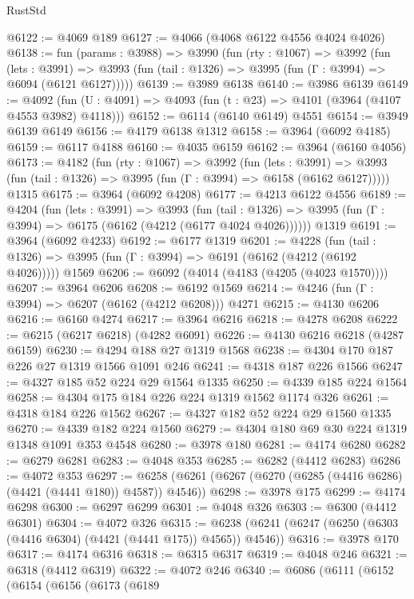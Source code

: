 \begin{lexlean}{RustStd}
\begin{coremodule}
{\begin{coremodule}
{{{{{{{{{{{{{{{{{{{{{{{{{{{{{{{{{{{{{{@6122 := @4069 @189
@6127 := @4066 (@4068 @6122 @4556 @4024 @4026)
@6138 := fun (params : @3988) =>
  @3990
    (fun (rty : @1067) =>
    @3992
      (fun (lets : @3991) =>
      @3993 (fun (tail : @1326) => @3995 (fun (Γ : @3994) => @6094 (@6121 @6127)))))
@6139 := @3989 @6138
@6140 := @3986 @6139
@6149 := @4092 (fun (U : @4091) => @4093 (fun (t : @23) => @4101 (@3964 (@4107 @4553 @3982) @4118)))
@6152 := @6114 (@6140 @6149) @4551
@6154 := @3949 @6139 @6149
@6156 := @4179 @6138 @1312
@6158 := @3964 (@6092 @4185)
@6159 := @6117 @4188
@6160 := @4035 @6159
@6162 := @3964 (@6160 @4056)
@6173 := @4182
    (fun (rty : @1067) =>
    @3992
      (fun (lets : @3991) =>
      @3993 (fun (tail : @1326) => @3995 (fun (Γ : @3994) => @6158 (@6162 @6127)))))
    @1315
@6175 := @3964 (@6092 @4208)
@6177 := @4213 @6122 @4556
@6189 := @4204
    (fun (lets : @3991) =>
    @3993
      (fun (tail : @1326) => @3995 (fun (Γ : @3994) => @6175 (@6162 (@4212 (@6177 @4024 @4026))))))
    @1319
@6191 := @3964 (@6092 @4233)
@6192 := @6177 @1319
@6201 := @4228
    (fun (tail : @1326) => @3995 (fun (Γ : @3994) => @6191 (@6162 (@4212 (@6192 @4026)))))
    @1569
@6206 := @6092 (@4014 (@4183 (@4205 (@4023 @1570))))
@6207 := @3964 @6206
@6208 := @6192 @1569
@6214 := @4246 (fun (Γ : @3994) => @6207 (@6162 (@4212 @6208))) @4271
@6215 := @4130 @6206
@6216 := @6160 @4274
@6217 := @3964 @6216
@6218 := @4278 @6208
@6222 := @6215 (@6217 @6218) (@4282 @6091)
@6226 := @4130 @6216 @6218 (@4287 @6159)
@6230 := @4294 @188 @27 @1319 @1568
@6238 := @4304 @170 @187 @226 @27 @1319 @1566 @1091 @246
@6241 := @4318 @187 @226 @1566
@6247 := @4327 @185 @52 @224 @29 @1564 @1335
@6250 := @4339 @185 @224 @1564
@6258 := @4304 @175 @184 @226 @224 @1319 @1562 @1174 @326
@6261 := @4318 @184 @226 @1562
@6267 := @4327 @182 @52 @224 @29 @1560 @1335
@6270 := @4339 @182 @224 @1560
@6279 := @4304 @180 @69 @30 @224 @1319 @1348 @1091 @353 @4548
@6280 := @3978 @180
@6281 := @4174 @6280
@6282 := @6279 @6281
@6283 := @4048 @353
@6285 := @6282 (@4412 @6283)
@6286 := @4072 @353
@6297 := @6258 (@6261 (@6267 (@6270 (@6285 (@4416 @6286) (@4421 (@4441 @180)) @4587)) @4546))
@6298 := @3978 @175
@6299 := @4174 @6298
@6300 := @6297 @6299
@6301 := @4048 @326
@6303 := @6300 (@4412 @6301)
@6304 := @4072 @326
@6315 := @6238 (@6241 (@6247 (@6250 (@6303 (@4416 @6304) (@4421 (@4441 @175)) @4565)) @4546))
@6316 := @3978 @170
@6317 := @4174 @6316
@6318 := @6315 @6317
@6319 := @4048 @246
@6321 := @6318 (@4412 @6319)
@6322 := @4072 @246
@6340 := @6086
    (@6111
      (@6152
        (@6154
          (@6156
            (@6173
              (@6189
}}}}}}}}}}}}}}}}}}}}}}}}}}}}}}}}}}}}}}
\end{coremodule}}
\end{coremodule}
\end{lexlean}
